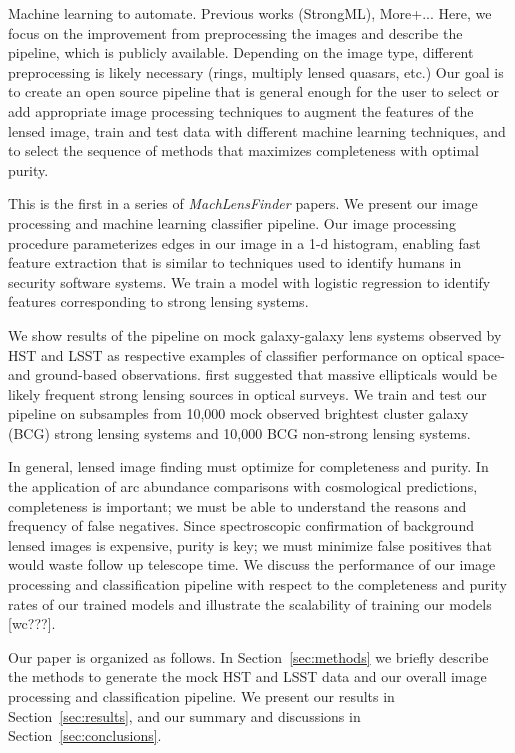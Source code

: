 \documentclass{emulateapj}
\begin{document}
Machine learning to automate.  Previous works (StrongML),
More+... Here, we focus on the improvement from preprocessing the
images and describe the pipeline, which is publicly available.
Depending on the image type, different preprocessing is likely
necessary (rings, multiply lensed quasars, etc.) Our goal is to create
an open source pipeline that is general enough for the user to select
or add appropriate image processing techniques to augment the features
of the lensed image, train and test data with different machine
learning techniques, and to select the sequence of methods that
maximizes completeness with optimal purity.

This is the first in a series of {\em MachLensFinder} papers.  We
present our image processing and machine learning classifier pipeline.
Our image processing procedure parameterizes edges in our image in a
1-d histogram, enabling fast feature extraction that is similar to
techniques used to identify humans in security software systems.  We
train a model with logistic regression to identify features
corresponding to strong lensing systems.

We show results of the pipeline on mock galaxy-galaxy lens systems
observed by HST and LSST as respective examples of classifier
performance on optical space- and ground-based observations.
\citet{miraldaescudeandlehar_92} first suggested that massive
ellipticals would be likely frequent strong lensing sources in optical
surveys.  We train and test our pipeline on subsamples from 10,000
mock observed brightest cluster galaxy (BCG) strong lensing systems
and 10,000 BCG non-strong lensing systems.

In general, lensed image finding must optimize for completeness and
purity.  In the application of arc abundance comparisons with
cosmological predictions, completeness is important; we must be able
to understand the reasons and frequency of false negatives.  Since
spectroscopic confirmation of background lensed images is expensive,
purity is key; we must minimize false positives that would waste
follow up telescope time.  We discuss the performance of our image
processing and classification pipeline with respect to the
completeness and purity rates of our trained models and illustrate the
scalability of training our models [wc???].

Our paper is organized as follows. In Section~\ref{sec:methods} we
briefly describe the methods to generate the mock HST and LSST data
and our overall image processing and classification pipeline. We
present our results in Section~\ref{sec:results}, and our summary and
discussions in Section~\ref{sec:conclusions}.
\end{document}

